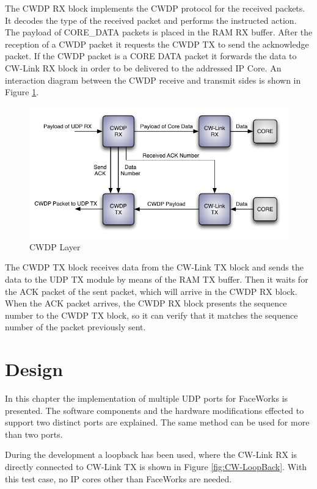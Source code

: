 \documentclass[conference]{IEEEtran}
\begin{document}
The CWDP RX block implements the CWDP protocol for the received packets. It decodes the type of the received packet and performs the instructed action. The payload of CORE\_DATA packets is placed in the RAM RX buffer. After the reception of a CWDP packet it requests the CWDP TX to send the acknowledge packet. If the CWDP packet is a CORE DATA packet it forwards the data to CW-Link RX block in order to be delivered to the addressed IP Core. An interaction diagram between the CWDP receive and transmit sides is shown in Figure \ref{fig:cwdp-transac}.

\begin{figure}[h]
  \centering
      \includegraphics[scale=0.75,center]{Diagrams/CWDP-simplified-transaction.pdf}
  \caption{CWDP Layer}
  \label{fig:cwdp-transac}
\end{figure}

The CWDP TX block receives data from the CW-Link TX block and sends the data to the UDP TX module by means of the RAM TX buffer. Then it waits for the ACK packet of the sent packet, which will arrive in the CWDP RX block. When the ACK packet arrives, the CWDP RX block presents the sequence number to the CWDP TX block, so it can verify that it matches the sequence number of the packet previously sent.

\section{Design}

In this chapter the implementation of multiple UDP ports for FaceWorks is presented. The software components and the hardware modifications effected to support two distinct ports are explained. The same method can be used for more than two ports.

During the development a loopback has been used, where the CW-Link RX is directly connected to CW-Link TX is shown in Figure \ref{fig:CW-LoopBack}. With this test case, no IP cores other than FaceWorks are needed.
\end{document}
